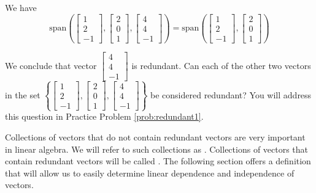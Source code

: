 \documentclass{ximera}
\begin{document}
\begin{exploration}
We have
$$\mbox{span}\left(\begin{bmatrix}1\\2\\-1\end{bmatrix},\begin{bmatrix}2\\0\\1\end{bmatrix},\begin{bmatrix}4\\4\\-1\end{bmatrix}\right)=\mbox{span}\left(\begin{bmatrix}1\\2\\-1\end{bmatrix},\begin{bmatrix}2\\0\\1\end{bmatrix}\right)$$

 We conclude that vector $\begin{bmatrix}4\\4\\-1\end{bmatrix}$ is redundant.  Can each of the other two vectors in the set 
 $\left\{\begin{bmatrix}1\\2\\-1\end{bmatrix},\begin{bmatrix}2\\0\\1\end{bmatrix},\begin{bmatrix}4\\4\\-1\end{bmatrix}\right\}$ be considered redundant?  You will address this question in Practice Problem \ref{prob:redundant1}.
\end{exploration}
 
 Collections of vectors that do not contain redundant vectors are very important in linear algebra.  We will refer to such collections as .  Collections of vectors that contain redundant vectors will be called .  The following section offers a definition that will allow us to easily determine linear dependence and independence of vectors.
\end{document}
